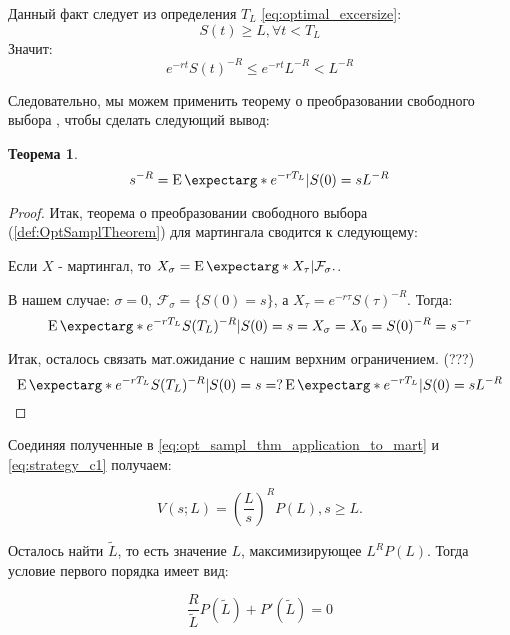 \documentclass[a4paper,12pt]{article}
\newtheorem{theorem}{Теорема}
\theoremstyle{definition}
\newcommand{\expect}{\operatorname{E}\expectarg}
\begin{document}
Данный факт следует из определения $T_L$ \eqref{eq:optimal_excersize}:
\begin{equation*}
S(t) \ge L, \forall t < T_L
\end{equation*}
Значит:
\begin{equation*}
e^{-rt}S(t)^{-R} \le e^{-rt}L^{-R} < L^{-R}
\end{equation*}

Следовательно, мы можем применить теорему о преобразовании свободного выбора \cite{bib:Shiryaev}, чтобы сделать следующий вывод:
\begin{theorem}
\begin{equation}\label{eq:opt_sampl_thm_application_to_mart}
s^{-R} = \expect*{e^{-rT_L} | S(0) = s} L^{-R}
\end{equation}
\end{theorem}
\begin{proof}
Итак, теорема о преобразовании свободного выбора (\ref{def:OptSamplTheorem}) для мартингала сводится к следующему:

Если ${X}$ - мартингал, то ${X_\sigma=\expect*{X_{\tau} | \mathcal{F}_\sigma}.}$.

В нашем случае: $\sigma = 0$, $\mathcal{F}_\sigma = \{S(0) = s\}$, а $X_{\tau} = e^{-r\tau} S(\tau)^{-R}$. Тогда:
\begin{equation*}
    \expect*{e^{-rT_L} S(T_L)^{-R} | S(0) = s} = X_\sigma = X_0 = S(0)^{-R} = s^{-r}
\end{equation*}

Итак, осталось связать мат.ожидание с нашим верхним ограничением. (???)
\begin{equation*}
     \expect*{e^{-rT_L} S(T_L)^{-R} | S(0) = s} =? \expect*{e^{-rT_L} | S(0) = s} L^{-R}
\end{equation*}
\end{proof}

Соединяя полученные в \eqref{eq:opt_sampl_thm_application_to_mart} и \eqref{eq:strategy_c1} получаем:

\begin{equation}\label{eq:strategy_c1_simplified}
V(s; L) = \left(\frac{L}{s}\right)^{R} P(L), s \ge L.
\end{equation}

Осталось найти $\widetilde{L}$, то есть значение $L$, максимизирующее $L^{R} P(L)$. Тогда условие первого порядка имеет вид:

\begin{equation}\label{eq:first_order_rule_m1}
    \frac{R}{\widetilde{L}} P(\widetilde{L}) + P'(\widetilde{L}) = 0
\end{equation}
\end{document}
